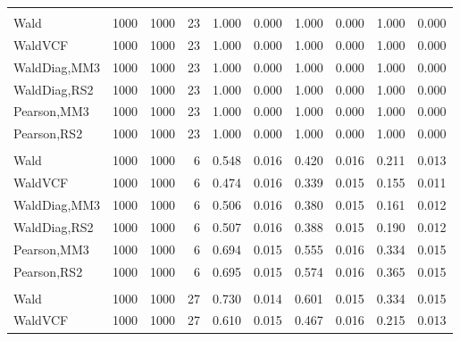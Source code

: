 \documentclass[
]{article}
\begin{document}
\begin{table}[H]
{\begin{tabular}[t]{lrrrrrrlrr}
\addlinespace[0.3em]
\multicolumn{10}{l}{\textbf{1F 15V}}\\
\hspace{1em}Wald & 1000 & 1000 & 23 & 1.000 & 0.000 & 1.000 & 0.000 & 1.000 & 0.000\\
\hspace{1em}WaldVCF & 1000 & 1000 & 23 & 1.000 & 0.000 & 1.000 & 0.000 & 1.000 & 0.000\\
\hspace{1em}WaldDiag,MM3 & 1000 & 1000 & 23 & 1.000 & 0.000 & 1.000 & 0.000 & 1.000 & 0.000\\
\hspace{1em}WaldDiag,RS2 & 1000 & 1000 & 23 & 1.000 & 0.000 & 1.000 & 0.000 & 1.000 & 0.000\\
\hspace{1em}Pearson,MM3 & 1000 & 1000 & 23 & 1.000 & 0.000 & 1.000 & 0.000 & 1.000 & 0.000\\
\hspace{1em}Pearson,RS2 & 1000 & 1000 & 23 & 1.000 & 0.000 & 1.000 & 0.000 & 1.000 & 0.000\\
\addlinespace[0.3em]
\multicolumn{10}{l}{\textbf{2F 10V}}\\
\hspace{1em}Wald & 1000 & 1000 & 6 & 0.548 & 0.016 & 0.420 & 0.016 & 0.211 & 0.013\\
\hspace{1em}WaldVCF & 1000 & 1000 & 6 & 0.474 & 0.016 & 0.339 & 0.015 & 0.155 & 0.011\\
\hspace{1em}WaldDiag,MM3 & 1000 & 1000 & 6 & 0.506 & 0.016 & 0.380 & 0.015 & 0.161 & 0.012\\
\hspace{1em}WaldDiag,RS2 & 1000 & 1000 & 6 & 0.507 & 0.016 & 0.388 & 0.015 & 0.190 & 0.012\\
\hspace{1em}Pearson,MM3 & 1000 & 1000 & 6 & 0.694 & 0.015 & 0.555 & 0.016 & 0.334 & 0.015\\
\hspace{1em}Pearson,RS2 & 1000 & 1000 & 6 & 0.695 & 0.015 & 0.574 & 0.016 & 0.365 & 0.015\\
\addlinespace[0.3em]
\multicolumn{10}{l}{\textbf{3F 15V}}\\
\hspace{1em}Wald & 1000 & 1000 & 27 & 0.730 & 0.014 & 0.601 & 0.015 & 0.334 & 0.015\\
\hspace{1em}WaldVCF & 1000 & 1000 & 27 & 0.610 & 0.015 & 0.467 & 0.016 & 0.215 & 0.013\\

\end{tabular}}
\end{table}
\end{document}
